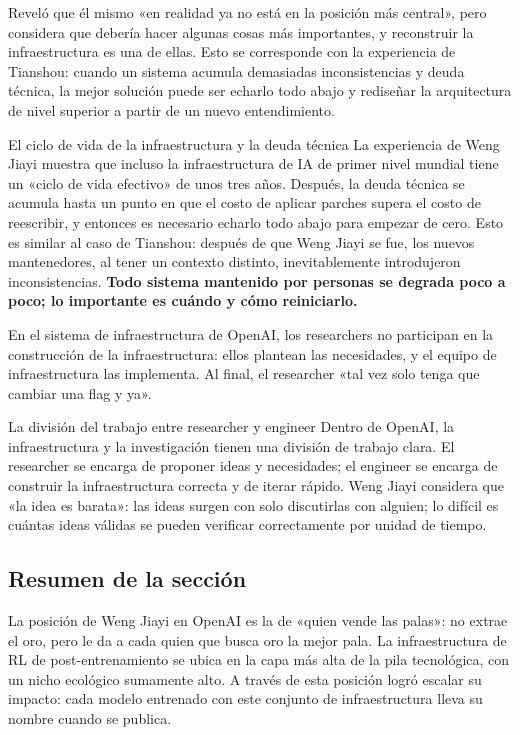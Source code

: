 Reveló que él mismo «en realidad ya no está en la posición más central», pero considera que debería hacer algunas cosas más importantes, y reconstruir la infraestructura es una de ellas. Esto se corresponde con la experiencia de Tianshou: cuando un sistema acumula demasiadas inconsistencias y deuda técnica, la mejor solución puede ser echarlo todo abajo y rediseñar la arquitectura de nivel superior a partir de un nuevo entendimiento.

\begin{warningbox}{El ciclo de vida de la infraestructura y la deuda técnica}
La experiencia de Weng Jiayi muestra que incluso la infraestructura de IA de primer nivel mundial tiene un «ciclo de vida efectivo» de unos tres años. Después, la deuda técnica se acumula hasta un punto en que el costo de aplicar parches supera el costo de reescribir, y entonces es necesario echarlo todo abajo para empezar de cero. Esto es similar al caso de Tianshou: después de que Weng Jiayi se fue, los nuevos mantenedores, al tener un contexto distinto, inevitablemente introdujeron inconsistencias. \textbf{Todo sistema mantenido por personas se degrada poco a poco; lo importante es cuándo y cómo reiniciarlo.}
\end{warningbox}

En el sistema de infraestructura de OpenAI, los researchers no participan en la construcción de la infraestructura: ellos plantean las necesidades, y el equipo de infraestructura las implementa. Al final, el researcher «tal vez solo tenga que cambiar una flag y ya».

\begin{knowledgebox}{La división del trabajo entre researcher y engineer}
Dentro de OpenAI, la infraestructura y la investigación tienen una división de trabajo clara. El researcher se encarga de proponer ideas y necesidades; el engineer se encarga de construir la infraestructura correcta y de iterar rápido. Weng Jiayi considera que «la idea es barata»: las ideas surgen con solo discutirlas con alguien; lo difícil es cuántas ideas válidas se pueden verificar correctamente por unidad de tiempo.
\end{knowledgebox}

\subsection{Resumen de la sección}

La posición de Weng Jiayi en OpenAI es la de «quien vende las palas»: no extrae el oro, pero le da a cada quien que busca oro la mejor pala. La infraestructura de RL de post-entrenamiento se ubica en la capa más alta de la pila tecnológica, con un nicho ecológico sumamente alto. A través de esta posición logró escalar su impacto: cada modelo entrenado con este conjunto de infraestructura lleva su nombre cuando se publica.
